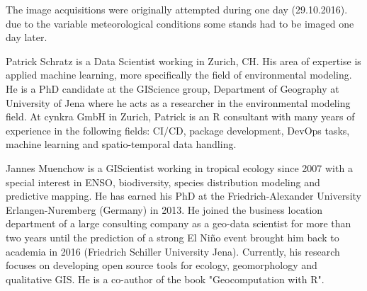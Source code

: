 \documentclass[journal]{IEEEtran}
\begin{document}
The image acquisitions were originally attempted during one day (29.10.2016).
due to the variable meteorological conditions some stands had to be imaged one day later.

\pagebreak




\pagebreak

\begin{IEEEbiography}
	{Patrick Schratz}
	is a Data Scientist working in Zurich, CH.
	His area of expertise is applied machine learning, more specifically the field of environmental modeling.
	He is a PhD candidate at the GIScience group, Department of Geography at University of Jena where he acts as a researcher in the environmental modeling field.
	At cynkra GmbH in Zurich, Patrick is an R consultant with many years of experience in the following fields: CI/CD, package development, DevOps tasks, machine learning and spatio-temporal data handling.
\end{IEEEbiography}
\begin{IEEEbiography}
	{Jannes Muenchow}
	is a GIScientist working in tropical ecology since 2007 with a special interest in ENSO, biodiversity, species distribution modeling and predictive mapping.
	He has earned his PhD at the Friedrich-Alexander University Erlangen-Nuremberg (Germany) in 2013.
	He joined the business location department of a large consulting company as a geo-data scientist for more than two years until the prediction of a strong El Niño event brought him back to academia in 2016 (Friedrich Schiller University Jena).
	Currently, his research focuses on developing open source tools for ecology, geomorphology and qualitative GIS.
	He is a co-author of the book "Geocomputation with R".
\end{IEEEbiography}
\end{document}
